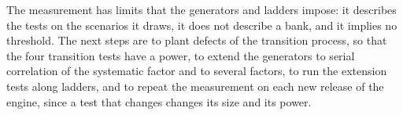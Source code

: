 The measurement has limits that the generators and ladders impose: it describes the tests on the scenarios it draws, it does not describe a bank, and it implies no threshold.
The next steps are to plant defects of the transition process, so that the four transition tests have a power, to extend the generators to serial correlation of the systematic factor and to several factors, to run the extension tests along ladders, and to repeat the measurement on each new release of the engine, since a test that changes changes its size and its power.
